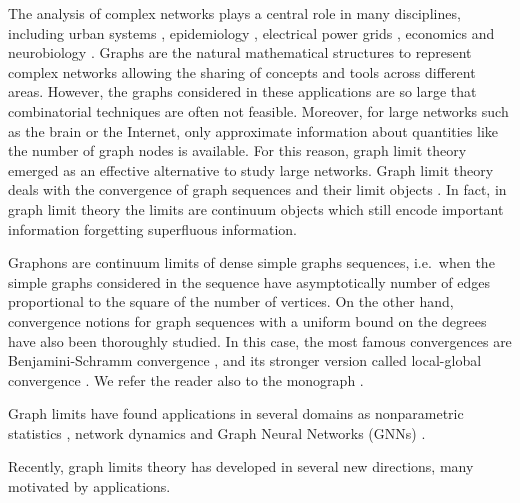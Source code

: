 \documentclass[11pt]{article}
\begin{document}
The analysis of complex networks plays a central role in many disciplines, including urban systems \cite{barthelemy_2016_structure}, epidemiology \cite{pastor-satorras_2015_epidemic}, electrical power grids \cite{pagani_2013_power}, economics \cite{hausmann_2013_atlas, battiston_2012_debtrank} and neurobiology \cite{fornito_2016_fundamentals}. Graphs are the natural mathematical structures to represent complex networks allowing the sharing of concepts and tools across different areas. However, the graphs considered in these applications are so large that combinatorial techniques are often not feasible. Moreover, for large networks such as the brain or the Internet, only approximate information about quantities like the number of graph nodes is available. For this reason, graph limit theory emerged as an effective alternative to study large networks. Graph limit theory deals with the convergence of graph sequences and their limit objects \cite{LovaszGraphLimits}. In fact, in graph limit theory the limits are continuum objects which still encode important information forgetting superfluous information.

Graphons \cite{BORGS20081801,Lovsz2007SzemerdisLF, LOVASZ2006933,borgs2011convergentAnnals} are continuum limits of dense simple graphs sequences, i.e.\ when the simple graphs considered in the sequence have asymptotically number of edges proportional to the square of the number of vertices. On the other hand, convergence notions for graph sequences with a uniform bound on the degrees have also been thoroughly studied. In this case, the most famous convergences are Benjamini-Schramm convergence \cite{BenjaminiLimit}, and its stronger version called local-global convergence \cite{local-global1,Hatami2014LimitsOL}. We refer the reader also to the monograph \cite{LovaszGraphLimits}.

Graph limits have found applications in several domains as nonparametric statistics \cite{wolfe2013nonparametricgraphonestimation,BorgsNonparaStat}, network dynamics \cite{Kuehn_2020GraphlimitDynam1,Kuehn_2019GraphlimitDynam2,bramburger2023pattern,MedvedevGraphLimitDynamics2,MedvedevGraphLimitDynamics1,gkogkas2022mean,bick2024dynamicalGraphLimi,ayi2023graphlimitinteractingparticle,ayi2024meanfieldlimitnonexchangeablemultiagent,kuehn2022vlasov,jabin2021meanfield,luccon2020quenched,bet2024weakly} and Graph Neural Networks (GNNs) \cite{keriven2024functions,NEURIPS2023_8154c89c,maskey2022generalization,maskey2023transferability,le2023poincar,levie2024graphon}. 

Recently, graph limits theory has developed in several new directions, many motivated by applications. 
\end{document}

